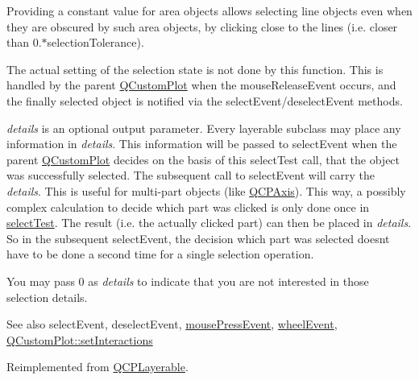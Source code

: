 Providing a constant value for area objects allows selecting line objects even when they are obscured by such area objects, by clicking close to the lines (i.\+e. closer than 0.$\ast$selection\+Tolerance).

The actual setting of the selection state is not done by this function. This is handled by the parent \hyperlink{class_q_custom_plot}{Q\+Custom\+Plot} when the mouse\+Release\+Event occurs, and the finally selected object is notified via the select\+Event/deselect\+Event methods.

{\itshape details} is an optional output parameter. Every layerable subclass may place any information in {\itshape details}. This information will be passed to select\+Event when the parent \hyperlink{class_q_custom_plot}{Q\+Custom\+Plot} decides on the basis of this select\+Test call, that the object was successfully selected. The subsequent call to select\+Event will carry the {\itshape details}. This is useful for multi-\/part objects (like \hyperlink{class_q_c_p_axis}{Q\+C\+P\+Axis}). This way, a possibly complex calculation to decide which part was clicked is only done once in \hyperlink{class_q_c_p_abstract_plottable_a38efe9641d972992a3d44204bc80ec1d}{select\+Test}. The result (i.\+e. the actually clicked part) can then be placed in {\itshape details}. So in the subsequent select\+Event, the decision which part was selected doesn\textquotesingle{}t have to be done a second time for a single selection operation.

You may pass 0 as {\itshape details} to indicate that you are not interested in those selection details.

\begin{DoxySeeAlso}{See also}
select\+Event, deselect\+Event, \hyperlink{class_q_c_p_layerable_af6567604818db90f4fd52822f8bc8376}{mouse\+Press\+Event}, \hyperlink{class_q_c_p_layerable_a47dfd7b8fd99c08ca54e09c362b6f022}{wheel\+Event}, \hyperlink{class_q_custom_plot_a5ee1e2f6ae27419deca53e75907c27e5}{Q\+Custom\+Plot\+::set\+Interactions} 
\end{DoxySeeAlso}


Reimplemented from \hyperlink{class_q_c_p_layerable_a4001c4d0dfec55598efa4d531f2179a9}{Q\+C\+P\+Layerable}.



